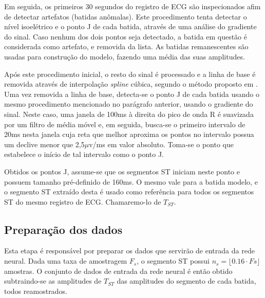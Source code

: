 Em seguida, os primeiros 30 segundos do registro de ECG são inspecionados afim de detectar artefatos (batidas anômalas). Este procedimento tenta detectar o nível isoelétrico e o ponto J de cada batida, através de uma análise do gradiente do sinal. Caso nenhum dos dois pontos seja detectado, a batida em questão é considerada como artefato, e removida da lista. As batidas remanescentes são usadas para construção do modelo, fazendo uma média das suas amplitudes.

Após este procedimento inicial, o resto do sinal é processado e a linha de base é removida através de interpolação \emph{spline} cúbica, segundo o método proposto em \cite{Badilini91}. Uma vez removida a linha de base, detecta-se o ponto J de cada batida usando o mesmo procedimento mencionado no parágrafo anterior, usando o gradiente do sinal. Neste caso, uma janela de 100ms à direita do pico de onda R é suavizada por um filtro de média móvel e, em seguida, busca-se o primeiro intervalo de 20ms nesta janela cuja reta que melhor aproxima os pontos no intervalo possua um declive menor que 2,5$\mu$v/ms em valor absoluto. Toma-se o ponto que estabelece o início de tal intervalo como o ponto J.

Obtidos os pontos J, assume-se que os segmentos ST iniciam neste ponto e possuem tamanho pré-definido de 160ms. O mesmo vale para a batida modelo, e o segmento ST extraído desta é usado como referência para todos os segmentos ST do mesmo registro de ECG. Chamaremo-lo de $T_{ST}$.

\subsection{Preparação dos dados}
Esta etapa é responsável por preparar os dados que servirão de entrada da rede neural. Dada uma taxa de amostragem $F_s$, o segmento ST possui $n_s = \lfloor0.16\cdot Fs\rfloor$ amostras. O conjunto de dados de entrada da rede neural é então obtido subtraindo-se as amplitudes de $T_{ST}$ das amplitudes do segmento de cada batida, todos reamostrados.
